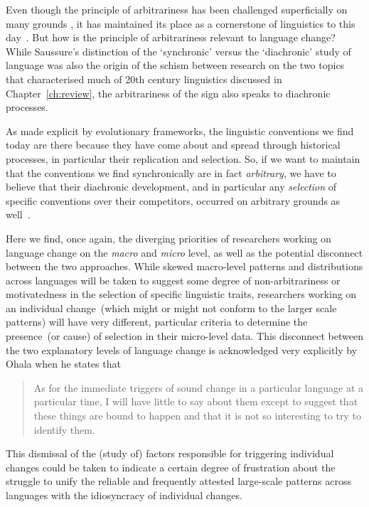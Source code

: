 Even though the principle of arbitrariness has been challenged superficially on many grounds \citep[in particular by work on sound-symbolism, see e.g.][]{Nygaard2009}, it has maintained its place as a cornerstone of linguistics to this day~\citep{Joseph2000}.
But how is the principle of arbitrariness relevant to language change? While Saussure's distinction of the `synchronic' versus the `diachronic' study of language was also the origin of the schism between research on the two topics that characterised much of 20th century linguistics discussed in Chapter~\ref{ch:review}, the arbitrariness of the sign also speaks to diachronic processes.

As made explicit by evolutionary frameworks, the linguistic conventions we find today are there because they have come about and spread through historical processes, in particular their replication and selection. So, if we want to maintain that the conventions we find synchronically are in fact \emph{arbitrary}, we have to believe that their diachronic development, and in particular any \emph{selection} of specific conventions over their competitors, occurred on arbitrary grounds as well~\citep[but see][p.93]{Joseph2015}.

Here we find, once again, the diverging priorities of researchers working on language change on the \emph{macro} and \emph{micro} level, as well as the potential disconnect between the two approaches. While skewed macro-level patterns and distributions across languages will be taken to suggest some degree of non-arbitrariness or motivatedness in the selection of specific linguistic traits, researchers working on an individual change~(which might or might not conform to the larger scale patterns) will have very different, particular criteria to determine the presence~(or cause) of selection in their micro-level data. This disconnect between the two explanatory levels of language change is acknowledged very explicitly by Ohala when he states that

\begin{quote}
As for the immediate triggers of sound change in a particular language at a particular time, I will have little to say about them except to suggest that these things are bound to happen and that it is not so interesting to try to identify them.~\citep[p.174]{Ohala1989} %
\end{quote}

This dismissal of the (study of) factors responsible for triggering individual changes could be taken to indicate a certain degree of frustration about the struggle to unify the reliable and frequently attested large-scale patterns across languages with the idiosyncracy of individual changes.

